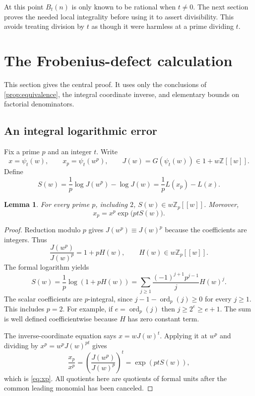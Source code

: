 \documentclass[11pt,letterpaper]{article}
\numberwithin{equation}{section}
\newtheorem{lemma}[lemma]{Lemma}
\theoremstyle{definition}
\theoremstyle{remark}
\newcommand{\Z}{\mathbb Z}
\newcommand{\Zp}{\mathbb Z_p}
\newcommand{\vp}{\operatorname{ord}_p}
\begin{document}
At this point $B_t(n)$ is only known to be rational when $t\ne0$.
The next section proves the needed local integrality before using it to
assert divisibility. This avoids treating division by $t$ as though it
were harmless at a prime dividing $t$.

\section{The Frobenius-defect calculation}\label{sec:framing}
This section gives the central proof. It uses only the conclusions of
\cref{prop:equivalence}, the integral coordinate inverse, and elementary
bounds on factorial denominators.

\subsection{An integral logarithmic error}
Fix a prime $p$ and an integer $t$. Write
\begin{equation}\label{eq:x-and-J}
 x=\psi_t(w),\qquad x_p=\psi_t(w^p),\qquad
 J(w)=G(\psi_t(w))\in1+w\Z[[w]].
\end{equation}
Define
\begin{equation}\label{eq:S}
 S(w)=\frac1p\log J(w^p)-\log J(w)
     =\frac1pL(x_p)-L(x).
\end{equation}

\begin{lemma}\label{lem:S}
For every prime $p$, including $2$,
$S(w)\in w\Zp[[w]]$. Moreover,
\begin{equation}\label{eq:xp}
 x_p=x^p\exp\bigl(ptS(w)\bigr).
\end{equation}
\end{lemma}
\begin{proof}
Reduction modulo $p$ gives $J(w^p)\equiv J(w)^p$ because the coefficients
are integers. Thus
\[
 \frac{J(w^p)}{J(w)^p}=1+pH(w),\qquad H(w)\in w\Zp[[w]].
\]
The formal logarithm yields
\[
 S(w)=\frac1p\log(1+pH(w))
     =\sum_{j\ge1}\frac{(-1)^{j+1}p^{j-1}}jH(w)^j.
\]
The scalar coefficients are $p$-integral, since
$j-1-\vp(j)\ge0$ for every $j\ge1$. This includes $p=2$.
For example, if $e=\vp(j)$ then $j\ge2^e\ge e+1$.
The sum is well defined coefficientwise because $H$ has zero constant term.

The inverse-coordinate equation says $x=wJ(w)^t$. Applying it at $w^p$
and dividing by $x^p=w^pJ(w)^{pt}$ gives
\[
 \frac{x_p}{x^p}
 =\left(\frac{J(w^p)}{J(w)^p}\right)^t
 =\exp(ptS(w)),
\]
which is \eqref{eq:xp}. All quotients here are quotients of formal units
after the common leading monomial has been canceled.
\end{proof}
\end{document}
